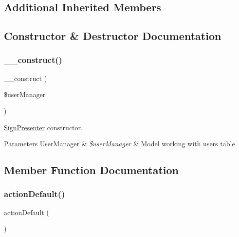 \subsection*{Additional Inherited Members}


\subsection{Constructor \& Destructor Documentation}
\mbox{\label{class_app_1_1_presenters_1_1_sign_presenter_a29d4b5fe645c2cef5f995a35d823029f}} 
\subsubsection{\texorpdfstring{\+\_\+\+\_\+construct()}{\_\_construct()}}
{\footnotesize\ttfamily \+\_\+\+\_\+construct (\begin{DoxyParamCaption}\item[{User\+Manager}]{\$user\+Manager }\end{DoxyParamCaption})}

\mbox{\hyperlink{class_app_1_1_presenters_1_1_sign_presenter}{Sign\+Presenter}} constructor.


\begin{DoxyParams}[1]{Parameters}
User\+Manager & {\em \$user\+Manager} & Model working with users table \\
\hline
\end{DoxyParams}


\subsection{Member Function Documentation}
\mbox{\label{class_app_1_1_presenters_1_1_sign_presenter_ab3af58fdd7adf8de36403909fa255979}} 
\subsubsection{\texorpdfstring{action\+Default()}{actionDefault()}}
{\footnotesize\ttfamily action\+Default (\begin{DoxyParamCaption}{ }\end{DoxyParamCaption})}

